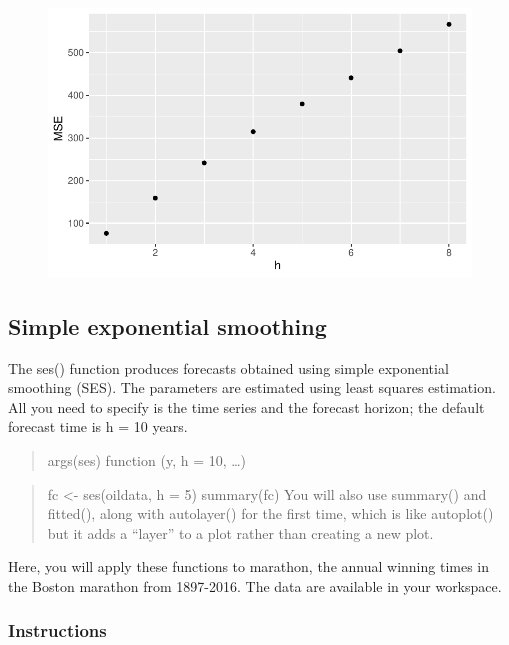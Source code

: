 \documentclass[
  letterpaper,
  DIV=11,
  numbers=noendperiod]{scrartcl}
\begin{document}
\begin{figure}[H]

{\centering \includegraphics{forecasting_datacamp_ex_files/figure-pdf/unnamed-chunk-11-1.pdf}

}

\end{figure}

\hypertarget{simple-exponential-smoothing}{%
\subsection{Simple exponential
smoothing}\label{simple-exponential-smoothing}}

The ses() function produces forecasts obtained using simple exponential
smoothing (SES). The parameters are estimated using least squares
estimation. All you need to specify is the time series and the forecast
horizon; the default forecast time is h = 10 years.

\begin{quote}
args(ses) function (y, h = 10, \ldots)
\end{quote}

\begin{quote}
fc \textless- ses(oildata, h = 5) summary(fc) You will also use
summary() and fitted(), along with autolayer() for the first time, which
is like autoplot() but it adds a ``layer'' to a plot rather than
creating a new plot.
\end{quote}

Here, you will apply these functions to marathon, the annual winning
times in the Boston marathon from 1897-2016. The data are available in
your workspace.

\hypertarget{instructions-8}{%
\subsubsection{Instructions}\label{instructions-8}}
\end{document}
